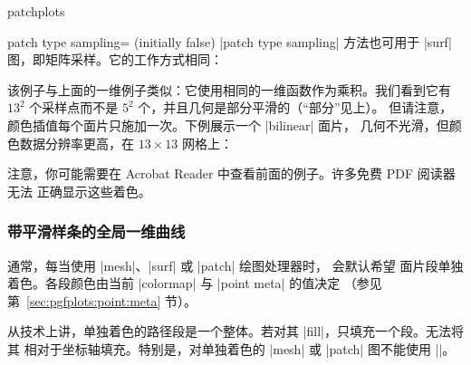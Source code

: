 {\begin{pgfplotslibrary}{patchplots}
\begin{pgfplotskey}{patch type sampling= (initially false)}
    |patch type sampling| 方法也可用于 |surf| 图，即矩阵采样。它的工作方式相同：
\begin{codeexample}[]
\end{codeexample}
    该例子与上面的一维例子类似：它使用相同的一维函数作为乘积。我们看到它有
    $13^2$ 个采样点而不是 $5^2$ 个，并且几何是部分平滑的（“部分”见上）。
    但请注意，颜色插值每个面片只施加一次。下例展示一个 |bilinear| 面片，
    几何不光滑，但颜色数据分辨率更高，在 $13\times13$ 网格上：
\begin{codeexample}[]
\end{codeexample}
    注意，你可能需要在 Acrobat Reader 中查看前面的例子。许多免费 PDF 阅读器无法
    正确显示这些着色。
\end{pgfplotskey}


\subsubsection{带平滑样条的全局一维曲线}

通常，每当使用 |mesh|、|surf| 或 |patch| 绘图处理器时，\PGFPlots{} 会默认希望
面片段单独着色。各段颜色由当前 |colormap| 与 |point meta| 的值决定
（参见第~\ref{sec:pgfplots:point:meta} 节）。

从技术上讲，单独着色的路径段是一个整体。若对其 |fill|，只填充一个段。无法将其
相对于坐标轴填充。特别是，对单独着色的 |mesh| 或 |patch| 图不能使用
|\closedcycle|。


\end{pgfplotslibrary}}
